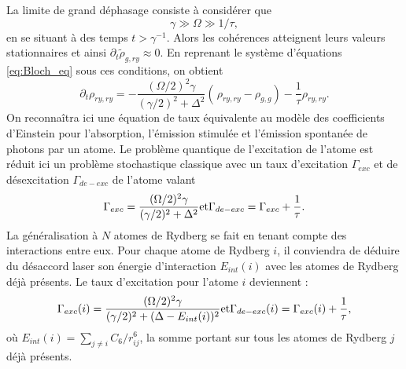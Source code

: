 La limite de grand déphasage consiste à considérer que
\begin{equation}
\label{eq:strong_dephasing}
\gamma \gg \Omega \gg 1/\tau,
\end{equation}
en se situant à des temps $t > \gamma^{-1}$.
Alors les cohérences atteignent leurs valeurs stationnaires et ainsi $\partial_t \tilde{\rho}_{g,ry} \approx 0$.
En reprenant le système d'équations \eqref{eq:Bloch_eq} sous ces conditions, on obtient 
\begin{equation}
\label{eq:Bloch_approx}
\partial_t \rho_{ry,ry} = -\frac{(\Omega/2)^2 \gamma}{(\gamma/2)^2 + \Delta^2} \left(\frac{}{}\! \rho_{ry,ry} - \rho_{g,g} \right) - \frac{1}{\tau} \rho_{ry,ry}.
\end{equation}
On reconnaîtra ici une équation de taux équivalente au modèle des coefficients d'Einstein pour l'absorption, l'émission stimulée et l'émission spontanée de photons par un atome.
Le problème quantique de l'excitation de l'atome est réduit ici un problème stochastique classique avec un taux d'excitation $\Gamma_{exc}$ et de désexcitation $\Gamma_{de-exc}$ de l'atome valant
\begin{equation}
\label{eq:exc_de-exc_rate_1at}
\Gamma_{exc} = \frac{(\Omega/2)^2 \gamma}{(\gamma/2)^2 + \Delta^2} \hfill \text{et} \hfill
\Gamma_{de-exc} = \Gamma_{exc}+\frac{1}{\tau}. \hfill
\end{equation}
La généralisation à $N$ atomes de Rydberg se fait en tenant compte des interactions entre eux.
Pour chaque atome de Rydberg $i$, il conviendra de déduire du désaccord laser son énergie d'interaction $E_{int}(i)$ avec les atomes de Rydberg déjà présents.
Le taux d'excitation pour l'atome $i$ deviennent :
\begin{equation}
\label{eq:exc_de-exc_rate_atomi}
\Gamma_{exc}(i) = \frac{(\Omega/2)^2 \gamma}{(\gamma/2)^2 + (\Delta - E_{int}(i))^2} \hfill \text{et} \hfill
\Gamma_{de-exc}(i) = \Gamma_{exc}(i)+\frac{1}{\tau}, \hfill
\end{equation}
où $E_{int}(i) = \sum_{j\neq i} C_6/r_{ij}^6$, la somme portant sur tous les atomes de Rydberg $j$ déjà présents.

